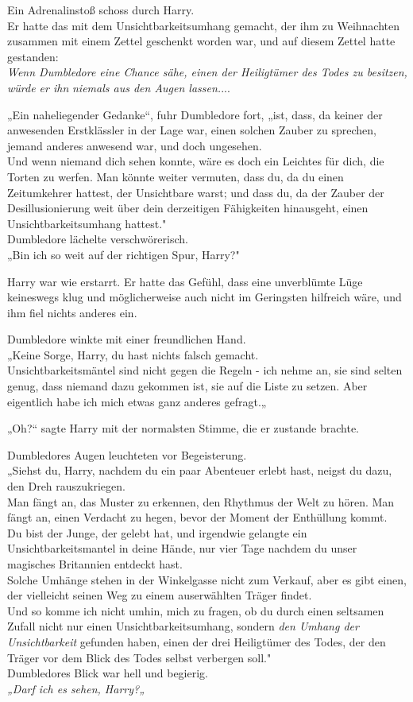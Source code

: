 {Ein Adrenalinstoß schoss durch Harry.\\ Er hatte das mit dem Unsichtbarkeitsumhang gemacht, der ihm zu Weihnachten zusammen mit einem Zettel geschenkt worden war, und auf diesem Zettel hatte gestanden:\\ \emph{Wenn Dumbledore eine Chance sähe, einen der Heiligtümer des Todes zu besitzen, würde er ihn} \emph{niemals aus den Augen lassen.}...

„Ein naheliegender Gedanke“, fuhr Dumbledore fort, „ist, dass, da keiner der anwesenden Erstklässler in der Lage war, einen solchen Zauber zu sprechen, jemand anderes anwesend war, und doch ungesehen.\\ Und wenn niemand dich sehen konnte, wäre es doch ein Leichtes für dich, die Torten zu werfen. Man könnte weiter vermuten, dass du, da du einen Zeitumkehrer hattest, der Unsichtbare warst; und dass du, da der Zauber der Desillusionierung weit über dein derzeitigen Fähigkeiten hinausgeht, einen Unsichtbarkeitsumhang hattest."\\ Dumbledore lächelte verschwörerisch.\\ „Bin ich so weit auf der richtigen Spur, Harry?"

Harry war wie erstarrt. Er hatte das Gefühl, dass eine unverblümte Lüge keineswegs klug und möglicherweise auch nicht im Geringsten hilfreich wäre, und ihm fiel nichts anderes ein.

Dumbledore winkte mit einer freundlichen Hand.\\ „Keine Sorge, Harry, du hast nichts falsch gemacht.\\ Unsichtbarkeitsmäntel sind nicht gegen die Regeln - ich nehme an, sie sind selten genug, dass niemand dazu gekommen ist, sie auf die Liste zu setzen. Aber eigentlich habe ich mich etwas ganz anderes gefragt.„

„Oh?“ sagte Harry mit der normalsten Stimme, die er zustande brachte.

Dumbledores Augen leuchteten vor Begeisterung.\\ „Siehst du, Harry, nachdem du ein paar Abenteuer erlebt hast, neigst du dazu, den Dreh rauszukriegen.\\ Man fängt an, das Muster zu erkennen, den Rhythmus der Welt zu hören. Man fängt an, einen Verdacht zu hegen, bevor der Moment der Enthüllung kommt.\\ Du bist der Junge, der gelebt hat, und irgendwie gelangte ein Unsichtbarkeitsmantel in deine Hände, nur vier Tage nachdem du unser magisches Britannien entdeckt hast.\\ Solche Umhänge stehen in der Winkelgasse nicht zum Verkauf, aber es gibt einen, der vielleicht seinen Weg zu einem auserwählten Träger findet.\\ Und so komme ich nicht umhin, mich zu fragen, ob du durch einen seltsamen Zufall nicht nur einen Unsichtbarkeitsumhang, sondern \emph{den Umhang der Unsichtbarkeit} gefunden haben, einen der drei Heiligtümer des Todes, der den Träger vor dem Blick des Todes selbst verbergen soll."\\ Dumbledores Blick war hell und begierig.\\ \emph{„Darf ich es sehen, Harry?„}

}
